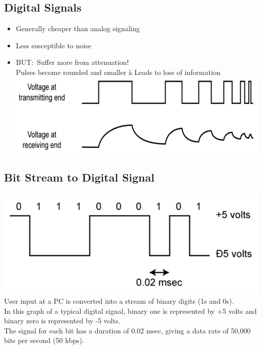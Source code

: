 \documentclass[11pt]{article}
\begin{document}
\subsection{Digital Signals}
\begin{itemize}
    \item Generally cheaper than analog signaling
    \item Less susceptible to noise
    \item BUT:\ Suffer more from attenuation! \\
    Pulses become rounded and smaller à Leads to loss of information \\
    \includegraphics[width=\textwidth]{digital-signals.png}

\end{itemize}
\subsection{Bit Stream to Digital Signal}
\includegraphics[width=\textwidth]{bit-stream-to-digital-signal}
User input at a PC is converted into a stream of binary digits (1s and 0s). \\
In this graph of a typical digital signal, binary one is represented by +5 volts and binary zero is represented by -5 volts. \\
The signal for each bit has a duration of 0.02 msec, giving a data rate of 50,000 bits per second (50 kbps). \\ 
\end{document}
